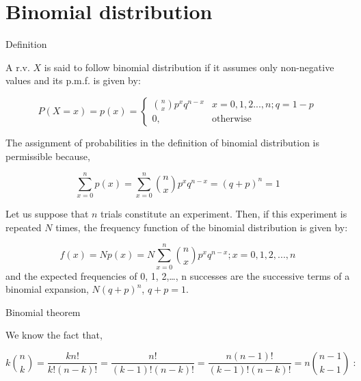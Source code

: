 \documentclass[ignorenonframetext,aspectratio=169]{beamer}
\begin{document}
\hypertarget{binomial-distribution}{%
\section{Binomial distribution}\label{binomial-distribution}}

\begin{frame}{Definition}
\protect\hypertarget{definition-2}{}

A r.v. \(X\) is said to follow binomial distribution if it assumes only
non-negative values and its p.m.f. is given by:

\[
P(X = x) = p(x) =
\begin{cases}
\binom{n}{x} p^xq^{n-x} & x = 0, 1, 2..., n; q = 1-p \\
0, & \text{otherwise}
\end{cases}
\]

\end{frame}

\begin{frame}{}
\protect\hypertarget{section-19}{}

The assignment of probabilities in the definition of binomial
distribution is permissible because,

\[
\sum^n_{x = 0} p(x) = \sum^n_{x = 0} \binom{n}{x} p^xq^{n-x} = (q + p)^n = 1
\]

\end{frame}

\begin{frame}{}
\protect\hypertarget{section-20}{}

Let us suppose that \(n\) trials constitute an experiment. Then, if this
experiment is repeated \(N\) times, the frequency function of the
binomial distribution is given by:

\[
f(x) = Np(x) = N\sum^n_{x = 0} \binom{n}{x} p^xq^{n-x}; x = 0, 1, 2, ..., n
\] and the expected frequencies of 0, 1, 2,\ldots{}, n successes are the
successive terms of a binomial expansion, \(N (q + p)^n\),
\(q + p = 1\).

\end{frame}

\begin{frame}{Binomial theorem}
\protect\hypertarget{binomial-theorem}{}

\small

We know the fact that,

\[
k\binom{n}k=\frac{kn!}{k!(n-k)!}=\frac{n!}{(k-1)!(n-k)!}=\frac{n(n-1)!}{(k-1)!(n-k)!}=n\binom{n-1}{k-1}\;:
\]

\end{frame}
\end{document}
